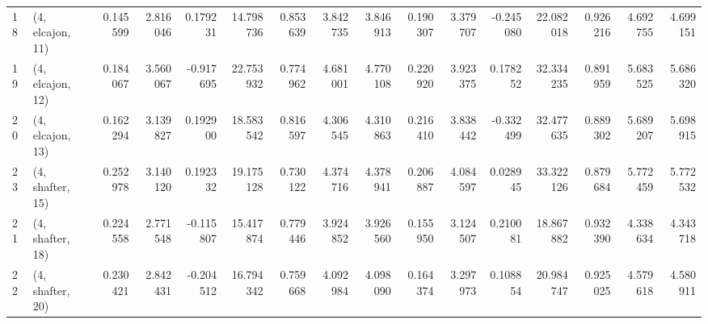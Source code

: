 \begin{tabular}{llrrrrrrrrrrrrrr}
18 &  (4, elcajon, 11) &   0.145599 &  2.816046 &  0.179231 &  14.798736 &  0.853639 &   3.842735 &  3.846913 &  0.190307 &   3.379707 & -0.245080 &   22.082018 &  0.926216 &   4.692755 &   4.699151 \\
19 &  (4, elcajon, 12) &   0.184067 &  3.560067 & -0.917695 &  22.753932 &  0.774962 &   4.681001 &  4.770108 &  0.220920 &   3.923375 &  0.178252 &   32.334235 &  0.891959 &   5.683525 &   5.686320 \\
20 &  (4, elcajon, 13) &   0.162294 &  3.139827 &  0.192900 &  18.583542 &  0.816597 &   4.306545 &  4.310863 &  0.216410 &   3.838442 & -0.332499 &   32.477635 &  0.889302 &   5.689207 &   5.698915 \\
23 &  (4, shafter, 15) &   0.252978 &  3.140120 &  0.192332 &  19.175128 &  0.730122 &   4.374716 &  4.378941 &  0.206887 &   4.084597 &  0.028945 &   33.322126 &  0.879684 &   5.772459 &   5.772532 \\
21 &  (4, shafter, 18) &   0.224558 &  2.771548 & -0.115807 &  15.417874 &  0.779446 &   3.924852 &  3.926560 &  0.155950 &   3.124507 &  0.210081 &   18.867882 &  0.932390 &   4.338634 &   4.343718 \\
22 &  (4, shafter, 20) &   0.230421 &  2.842431 & -0.204512 &  16.794342 &  0.759668 &   4.092984 &  4.098090 &  0.164374 &   3.297973 &  0.108854 &   20.984747 &  0.925025 &   4.579618 &   4.580911 \\
\bottomrule
\end{tabular}
